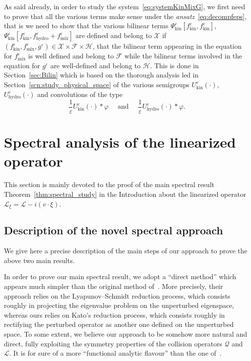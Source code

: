 \documentclass[AHL,Unicode,longabstracts,published]{cedram}
\newcommand{\hyd}{\mathrm{hydro}}
\newcommand{\mix}{\mathrm{mix}}
\newcommand{\kin}{\mathrm{kin}}
\newcommand{\LL}{\mathcal{L}}
\newcommand{\QQ}{\mathcal{Q}}
\newcommand{\FFF}{\mathscr{F}}
\newcommand{\HHH}{\mathscr{H}}
\newcommand{\GGG}{\mathscr{X}}
\newcommand{\SSSs}{\HHH}
\newcommand{\SSSl}{\GGG}
\newcommand{\SSSm}{\FFF}
\newcommand*\eps{{\varepsilon}}
\begin{document}
As said already, in order to study the system~\eqref{eq:systemKinMixG}, we first need to prove that all the various terms make sense under the \emph{ansatz}~\eqref{eq:decompfeps}, that is we need to show that the various bilinear terms $\Psi^\eps_\kin [f^\eps_\kin, f^\eps_\kin]$, $\Psi^\eps_\kin[f^\eps_\kin, f^\eps_\hyd + f^\eps_\mix]$ are defined and belong to $\SSSl$ if $(f^\eps_\kin, f^\eps_\mix, g^\eps) \in \SSSl \times \SSSm \times \SSSs$, that the bilinear term appearing in the equation for $f_\mix^\eps$ is well defined and belong to $\SSSm$ while the bilinear terms involved in the equation for $g^\eps$ are well-defined and belong to $\SSSs.$ This is done in Section~\ref{sec:Bilin} which is based on the thorough analysis led in Section~\ref{scn:study_physical_space} of the various semigroups $U^\eps_\kin(\cdot)$, $U^\eps_\hyd(\cdot)$ and convolutions of the type
\[
\frac{1}{\eps} U^\eps_\kin(\cdot) \ast \varphi \quad \text{ and } \quad \frac{1}{\eps}U^\eps_\hyd(\cdot) \ast \varphi.
\]

\section{Spectral analysis of the linearized operator}\label{scn:spectral_study}

This section is mainly devoted to the proof of the main spectral result Theorem~\ref{thm:spectral_study} in the Introduction about the linearized operator $\LL_{\xi} = \LL - i (v \cdot \xi).$

\subsection{Description of the novel spectral approach} \label{sec:newspec}
We give here a precise description of the main steps of our approach to prove the above two main results.

{ In order to prove our main spectral result, we adopt a ``direct method'' which appears much simpler than the original method of~\cite{EP1975}. More precisely, their approach relies on the Lyapunov--Schmidt reduction process, which consists roughly in projecting the eigenvalue problem on the unperturbed eigenspace, whereas ours relies on Kato's reduction process, which consists roughly in rectifying the perturbed operator as another one defined on the unperturbed space. To some extent, we believe our approach to be somehow more natural and direct, fully exploiting the symmetry properties of the collision operators $\QQ$ and $\LL$. It is for sure of a more ``functional analytic flavour'' than the one of~\cite{EP1975}.}
\end{document}

